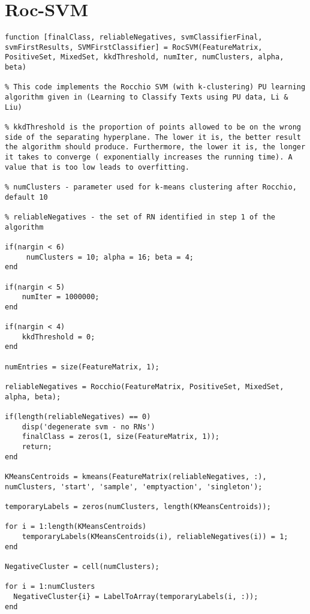 \documentclass[12pt,twoside,notitlepage,amsart]{report} %
\begin{document}
\clearpage

	\section{Roc-SVM}

	\begin{lstlisting}
function [finalClass, reliableNegatives, svmClassifierFinal, svmFirstResults, SVMFirstClassifier] = RocSVM(FeatureMatrix, PositiveSet, MixedSet, kkdThreshold, numIter, numClusters, alpha, beta)

% This code implements the Rocchio SVM (with k-clustering) PU learning algorithm given in (Learning to Classify Texts using PU data, Li & Liu)

% kkdThreshold is the proportion of points allowed to be on the wrong side of the separating hyperplane. The lower it is, the better result the algorithm should produce. Furthermore, the lower it is, the longer it takes to converge ( exponentially increases the running time). A value that is too low leads to overfitting. 

% numClusters - parameter used for k-means clustering after Rocchio, default 10

% reliableNegatives - the set of RN identified in step 1 of the algorithm

if(nargin < 6)
     numClusters = 10; alpha = 16; beta = 4;
end

if(nargin < 5)
    numIter = 1000000;
end

if(nargin < 4) 
    kkdThreshold = 0;
end

numEntries = size(FeatureMatrix, 1);

reliableNegatives = Rocchio(FeatureMatrix, PositiveSet, MixedSet, alpha, beta);

if(length(reliableNegatives) == 0) 
    disp('degenerate svm - no RNs')
    finalClass = zeros(1, size(FeatureMatrix, 1));
    return;
end

KMeansCentroids = kmeans(FeatureMatrix(reliableNegatives, :), numClusters, 'start', 'sample', 'emptyaction', 'singleton');

temporaryLabels = zeros(numClusters, length(KMeansCentroids));

for i = 1:length(KMeansCentroids)
    temporaryLabels(KMeansCentroids(i), reliableNegatives(i)) = 1;
end

NegativeCluster = cell(numClusters);

for i = 1:numClusters
  NegativeCluster{i} = LabelToArray(temporaryLabels(i, :));
end


\end{lstlisting}
\end{document}

